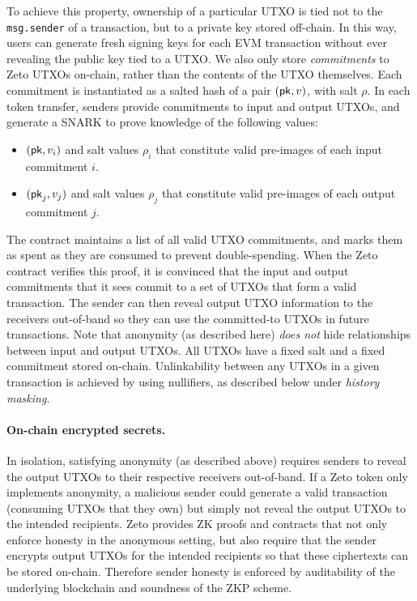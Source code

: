 To achieve this property, ownership of a particular UTXO is tied not to the \texttt{msg.sender} of a transaction, but to a private key stored off-chain. In this way, users can generate fresh signing keys for each EVM transaction without ever revealing the public key tied to a UTXO. We also only store \textit{commitments} to Zeto UTXOs on-chain, rather than the contents of the UTXO themselves. Each commitment is instantiated as a salted hash of a pair $(\mathsf{pk}, v)$, with salt $\rho$. In each token transfer, senders provide commitments to input and output UTXOs, and generate a SNARK to prove knowledge of the following values:
\begin{itemize}
  \item $(\mathsf{pk}, v_i)$ and salt values $\rho_i$ that constitute valid pre-images of each input commitment $i$.
  \item $(\mathsf{pk}_j, v_j)$ and salt values $\rho_j$ that constitute valid pre-images of each output commitment $j$.
\end{itemize}

The contract maintains a list of all valid UTXO commitments, and marks them as spent as they are consumed to prevent double-spending. When the Zeto contract verifies this proof, it is convinced that the input and output commitments that it sees commit to a set of UTXOs that form a valid transaction. The sender can then reveal output UTXO information to the receivers out-of-band so they can use the committed-to UTXOs in future transactions. Note that anonymity (as described here) \textit{does not} hide relationships between input and output UTXOs. All UTXOs have a fixed salt and a fixed commitment stored on-chain. Unlinkability between any UTXOs in a given transaction is achieved by using nullifiers, as described below under \textit{history masking}.

\paragraph{On-chain encrypted secrets.} In isolation, satisfying anonymity (as described above) requires senders to reveal the output UTXOs to their respective receivers out-of-band. If a Zeto token only implements anonymity, a malicious sender could generate a valid transaction (consuming UTXOs that they own) but simply not reveal the output UTXOs to the intended recipients. Zeto provides ZK proofs and contracts that not only enforce honesty in the anonymous setting, but also require that the sender encrypts output UTXOs for the intended recipients so that these ciphertexts can be stored on-chain. Therefore sender honesty is enforced by auditability of the underlying blockchain and soundness of the ZKP scheme.

